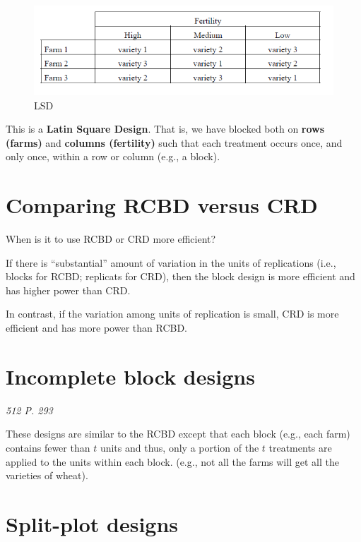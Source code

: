 \documentclass[]{book}
\begin{document}
\begin{figure}
\centering
\includegraphics{LSD.png}
\caption{LSD}
\end{figure}

This is a \textbf{Latin Square Design}. That is, we have blocked both on \textbf{rows (farms)} and \textbf{columns (fertility)} such that each treatment occurs once, and only once, within a row or column (e.g., a block).

\hypertarget{comparing-rcbd-versus-crd}{%
\section{Comparing RCBD versus CRD}\label{comparing-rcbd-versus-crd}}

When is it to use RCBD or CRD more efficient?

If there is ``substantial'' amount of variation in the units of replications (i.e., blocks for RCBD; replicats for CRD), then the block design is more efficient and has higher power than CRD.

In contrast, if the variation among units of replication is small, CRD is more efficient and has more power than RCBD.

\hypertarget{incomplete-block-designs}{%
\section{Incomplete block designs}\label{incomplete-block-designs}}

\emph{512 P. 293}

These designs are similar to the RCBD except that each block (e.g., each farm) contains fewer than \(t\) units and thus, only a portion of the \(t\) treatments are applied to the units within each block. (e.g., not all the farms will get all the varieties of wheat).

\hypertarget{split-plot-designs}{%
\section{Split-plot designs}\label{split-plot-designs}}
\end{document}

